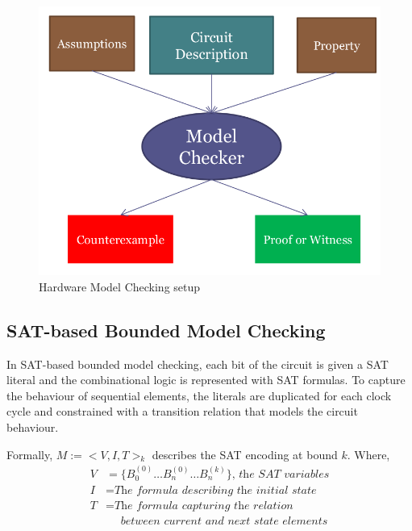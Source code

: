 \documentclass[letterpaper]{article} %
\begin{document}
\begin{figure}[H]
\begin{center}
  \includegraphics[scale=0.2]{hwmc.png}
  \caption{Hardware Model Checking setup}
  \label{hwmc}
\end{center}
\end{figure}

\subsection{SAT-based Bounded Model Checking}
In SAT-based bounded model checking, each bit of the circuit is given a SAT literal and the combinational logic is represented with SAT formulas. To capture the behaviour of sequential elements, the literals are duplicated for each clock cycle and constrained with a transition relation that models the circuit behaviour.

Formally, $M := <V, I, T>_k$ describes the SAT encoding at bound $k$. Where, 
\begin{equation*}
\begin{split}
V &= \{B_0^{(0)} \dots B_{n}^{(0)} \dots B_{n}^{(k)}\} \textit{, the SAT variables} \\
I &= \textit{The formula describing the initial state} \\
T &= \textit{The formula capturing the relation} \\
&  \ \  \ \  \ \  \textit{between current and next state elements}
\end{split}
\end{equation*}
\end{document}

